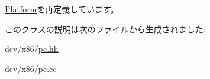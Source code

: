\hyperlink{classPlatform_af27ccd765f13a4b7bd119dc7579e2746}{Platform}を再定義しています。

このクラスの説明は次のファイルから生成されました:\begin{DoxyCompactItemize}
\item 
dev/x86/\hyperlink{pc_8hh}{pc.hh}\item 
dev/x86/\hyperlink{pc_8cc}{pc.cc}\end{DoxyCompactItemize}
